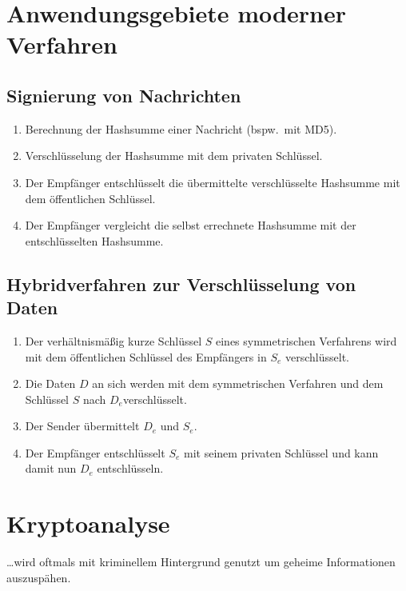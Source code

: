 \section[Anwendungsgebiete]{Anwendungsgebiete moderner Verfahren}


\subsection{Signierung von Nachrichten}
\begin{enumerate}
  \item {}Berechnung der Hashsumme einer Nachricht (bspw.~mit MD5).
  \item Verschlüsselung der Hashsumme mit dem privaten Schlüssel.
  \item Der Empfänger entschlüsselt die übermittelte verschlüsselte Hashsumme mit dem öffentlichen Schlüssel.
  \item Der Empfänger vergleicht die selbst errechnete Hashsumme mit der entschlüsselten Hashsumme.
\end{enumerate}

\subsection[Hybridverfahren]{Hybridverfahren zur Verschlüsselung von Daten}
\begin{enumerate}
  \item {}Der verhältnismäßig kurze Schlüssel $S$ eines symmetrischen Verfahrens wird
	mit dem öffentlichen Schlüssel des Empfängers in $S_e$ verschlüsselt.
  \item Die Daten $D$ an sich werden mit dem symmetrischen Verfahren und dem Schlüssel $S$ nach $D_e$verschlüsselt.
  \item Der Sender übermittelt $D_e$ und $S_e$.
  \item Der Empfänger entschlüsselt $S_e$ mit seinem privaten Schlüssel und kann damit nun $D_e$ entschlüsseln.
\end{enumerate}

\section{Kryptoanalyse}

\ldots{}wird oftmals mit kriminellem Hintergrund genutzt um geheime Informationen auszuspähen.

